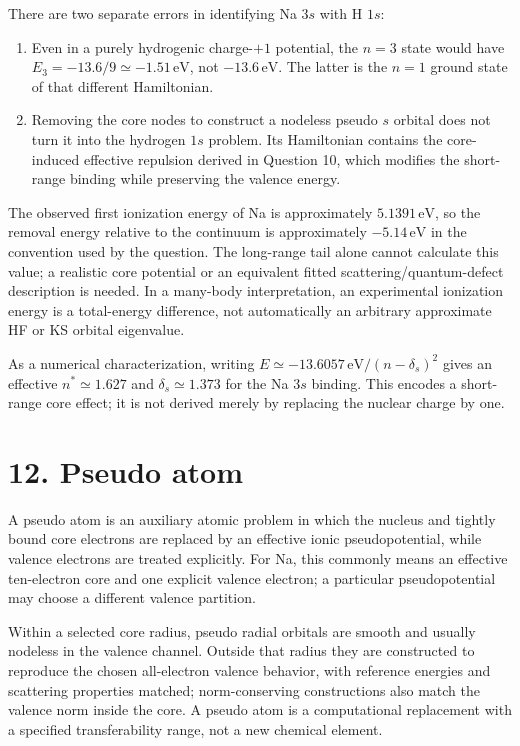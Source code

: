 There are two separate errors in identifying Na $3s$ with H $1s$:
\begin{enumerate}[label=(\roman*)]
\item Even in a purely hydrogenic charge-$+1$ potential, the $n=3$ state would have $E_3=-13.6/9\simeq-1.51\,\mathrm{eV}$, not $-13.6\,\mathrm{eV}$. The latter is the $n=1$ ground state of that different Hamiltonian.
\item Removing the core nodes to construct a nodeless pseudo $s$ orbital does not turn it into the hydrogen $1s$ problem. Its Hamiltonian contains the core-induced effective repulsion derived in Question 10, which modifies the short-range binding while preserving the valence energy.
\end{enumerate}
The observed first ionization energy of Na is approximately $5.1391\,\mathrm{eV}$, so the removal energy relative to the continuum is approximately $-5.14\,\mathrm{eV}$ in the convention used by the question. The long-range tail alone cannot calculate this value; a realistic core potential or an equivalent fitted scattering/quantum-defect description is needed. In a many-body interpretation, an experimental ionization energy is a total-energy difference, not automatically an arbitrary approximate HF or KS orbital eigenvalue.

As a numerical characterization, writing $E\simeq-13.6057\,\mathrm{eV}/(n-\delta_s)^2$ gives an effective $n^*\simeq1.627$ and $\delta_s\simeq1.373$ for the Na $3s$ binding. This encodes a short-range core effect; it is not derived merely by replacing the nuclear charge by one.

\section*{12. Pseudo atom}
A pseudo atom is an auxiliary atomic problem in which the nucleus and tightly bound core electrons are replaced by an effective ionic pseudopotential, while valence electrons are treated explicitly. For Na, this commonly means an effective ten-electron core and one explicit valence electron; a particular pseudopotential may choose a different valence partition.

Within a selected core radius, pseudo radial orbitals are smooth and usually nodeless in the valence channel. Outside that radius they are constructed to reproduce the chosen all-electron valence behavior, with reference energies and scattering properties matched; norm-conserving constructions also match the valence norm inside the core. A pseudo atom is a computational replacement with a specified transferability range, not a new chemical element.

